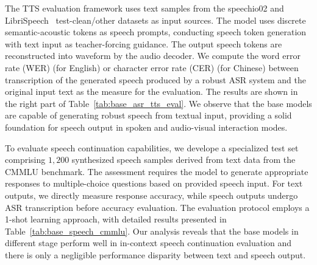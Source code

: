 \documentclass{article}
\begin{document}
The TTS evaluation framework uses text samples from the speechio02 and LibriSpeech~\citep{panayotov2015librispeech} test-clean/other datasets as input sources. The model uses discrete semantic-acoustic tokens as speech prompts, conducting speech token generation with text input as teacher-forcing guidance. The output speech tokens are reconstructed into waveform by the audio decoder. We compute the word error rate (WER) (for English) or character error rate (CER) (for Chinese) between transcription of the generated speech produced by a robust ASR system and the original input text as the measure for the evaluation. The results are shown in the right part of Table~\ref{tab:base_asr_tts_eval}. We observe that the base models are capable of generating robust speech from textual input, providing a solid foundation for speech output in spoken and audio-visual interaction modes.

To evaluate speech continuation capabilities, we develope a specialized test set comprising $1,200$ synthesized speech samples derived from text data from the CMMLU \citep{li2023cmmlu} benchmark.
The assessment requires the model to generate appropriate responses to multiple-choice questions based on provided speech input. For text outputs, we directly measure response accuracy, while speech outputs undergo ASR transcription before accuracy evaluation. The evaluation protocol employs a 1-shot learning approach, with detailed results presented in Table~\ref{tab:base_speech_cmmlu}. 
Our analysis reveals that the base models in different stage perform well in in-context speech continuation evaluation and there is only a negligible performance disparity between text and speech output.

\begin{table}[h!]
\centering
\caption{Speech continuation performance of base models across pre-training stages. Accuracy is reported as a percentage.}
\label{tab:base_speech_cmmlu}
\end{table}
\end{document}
